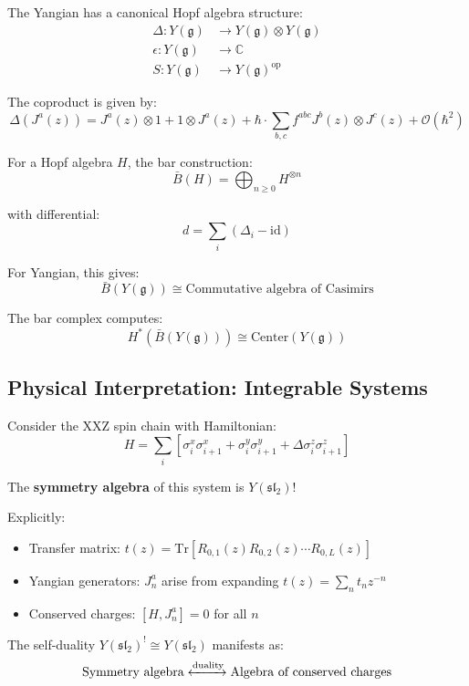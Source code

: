 \begin{theorem}
The Yangian has a canonical Hopf algebra structure:
\begin{align}
\Delta: Y(\mathfrak{g}) &\to Y(\mathfrak{g}) \otimes Y(\mathfrak{g}) \\
\epsilon: Y(\mathfrak{g}) &\to \mathbb{C} \\
S: Y(\mathfrak{g}) &\to Y(\mathfrak{g})^{\text{op}}
\end{align}

The coproduct is given by:
$$\Delta(J^a(z)) = J^a(z) \otimes 1 + 1 \otimes J^a(z) + \hbar \cdot 
\sum_{b,c} f^{abc} J^b(z) \otimes J^c(z) + \mathcal{O}(\hbar^2)$$
\end{theorem}

\begin{theorem}
For a Hopf algebra $H$, the bar construction:
$$\bar{B}(H) = \bigoplus_{n \geq 0} H^{\otimes n}$$

with differential:
$$d = \sum_{i} (\Delta_i - \text{id})$$

For Yangian, this gives:
$$\bar{B}(Y(\mathfrak{g})) \cong \text{Commutative algebra of Casimirs}$$

The bar complex computes:
$$H^*(\bar{B}(Y(\mathfrak{g}))) \cong \text{Center}(Y(\mathfrak{g}))$$
\end{theorem}

\subsection{Physical Interpretation: Integrable Systems}

\begin{example}
Consider the XXZ spin chain with Hamiltonian:
$$H = \sum_i \left[\sigma^x_i \sigma^x_{i+1} + \sigma^y_i \sigma^y_{i+1} + 
\Delta \sigma^z_i \sigma^z_{i+1}\right]$$

The \textbf{symmetry algebra} of this system is $Y(\mathfrak{sl}_2)$!

Explicitly:
\begin{itemize}
\item Transfer matrix: $t(z) = \text{Tr}[R_{0,1}(z) R_{0,2}(z) \cdots R_{0,L}(z)]$
\item Yangian generators: $J^a_n$ arise from expanding $t(z) = \sum_n t_n z^{-n}$
\item Conserved charges: $[H, J^a_n] = 0$ for all $n$
\end{itemize}

The self-duality $Y(\mathfrak{sl}_2)^! \cong Y(\mathfrak{sl}_2)$ manifests as:
$$\text{Symmetry algebra} \xleftrightarrow{\text{duality}} \text{Algebra of conserved charges}$$
\end{example}

